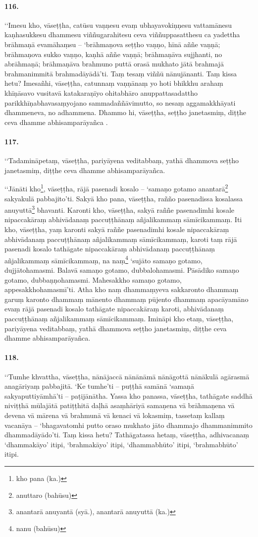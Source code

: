 \paragraph{116.} ‘‘Imesu kho, vāseṭṭha, catūsu vaṇṇesu evaṃ ubhayavokiṇṇesu vattamānesu kaṇhasukkesu dhammesu viññugarahitesu ceva viññuppasatthesu ca yadettha brāhmaṇā evamāhaṃsu – ‘brāhmaṇova seṭṭho vaṇṇo, hīnā aññe vaṇṇā; brāhmaṇova sukko vaṇṇo, kaṇhā aññe vaṇṇā; brāhmaṇāva sujjhanti, no abrāhmaṇā; brāhmaṇāva brahmuno puttā orasā mukhato jātā brahmajā brahmanimmitā brahmadāyādā’ti. Taṃ tesaṃ viññū nānujānanti. Taṃ kissa hetu? Imesañhi, vāseṭṭha, catunnaṃ vaṇṇānaṃ yo hoti bhikkhu arahaṃ khīṇāsavo vusitavā katakaraṇīyo ohitabhāro anuppattasadattho parikkhīṇabhavasaṃyojano sammadaññāvimutto, so nesaṃ aggamakkhāyati dhammeneva, no adhammena. Dhammo hi, vāseṭṭha, seṭṭho janetasmiṃ, diṭṭhe ceva dhamme abhisamparāyañca .

\paragraph{117.} ‘‘Tadamināpetaṃ, vāseṭṭha, pariyāyena veditabbaṃ, yathā dhammova seṭṭho janetasmiṃ, diṭṭhe ceva dhamme abhisamparāyañca.

‘‘Jānāti kho\footnote{kho pana (ka.)}, vāseṭṭha, rājā pasenadi kosalo – ‘samaṇo gotamo anantarā\footnote{anuttaro (bahūsu)} sakyakulā pabbajito’ti. Sakyā kho pana, vāseṭṭha, rañño pasenadissa kosalassa anuyuttā\footnote{anantarā anuyantā (syā.), anantarā anuyuttā (ka.)} bhavanti. Karonti kho, vāseṭṭha, sakyā raññe pasenadimhi kosale nipaccakāraṃ abhivādanaṃ paccuṭṭhānaṃ añjalikammaṃ sāmīcikammaṃ. Iti kho, vāseṭṭha, yaṃ karonti sakyā raññe pasenadimhi kosale nipaccakāraṃ abhivādanaṃ paccuṭṭhānaṃ añjalikammaṃ sāmīcikammaṃ, karoti taṃ rājā pasenadi kosalo tathāgate nipaccakāraṃ abhivādanaṃ paccuṭṭhānaṃ añjalikammaṃ sāmīcikammaṃ, na naṃ\footnote{nanu (bahūsu)} ‘sujāto samaṇo gotamo, dujjātohamasmi. Balavā samaṇo gotamo, dubbalohamasmi. Pāsādiko samaṇo gotamo, dubbaṇṇohamasmi. Mahesakkho samaṇo gotamo, appesakkhohamasmī’ti. Atha kho naṃ dhammaṃyeva sakkaronto dhammaṃ garuṃ karonto dhammaṃ mānento dhammaṃ pūjento dhammaṃ apacāyamāno evaṃ rājā pasenadi kosalo tathāgate nipaccakāraṃ karoti, abhivādanaṃ paccuṭṭhānaṃ añjalikammaṃ sāmīcikammaṃ. Imināpi kho etaṃ, vāseṭṭha, pariyāyena veditabbaṃ, yathā dhammova seṭṭho janetasmiṃ, diṭṭhe ceva dhamme abhisamparāyañca.

\paragraph{118.} ‘‘Tumhe khvattha, vāseṭṭha, nānājaccā nānānāmā nānāgottā nānākulā agārasmā anagāriyaṃ pabbajitā. ‘Ke tumhe’ti – puṭṭhā samānā ‘samaṇā sakyaputtiyāmhā’ti – paṭijānātha. Yassa kho panassa, vāseṭṭha, tathāgate saddhā niviṭṭhā mūlajātā patiṭṭhitā daḷhā asaṃhāriyā samaṇena vā brāhmaṇena vā devena vā mārena vā brahmunā vā kenaci vā lokasmiṃ, tassetaṃ kallaṃ vacanāya – ‘bhagavatomhi putto oraso mukhato jāto dhammajo dhammanimmito dhammadāyādo’ti. Taṃ kissa hetu? Tathāgatassa hetaṃ, vāseṭṭha, adhivacanaṃ ‘dhammakāyo’ itipi, ‘brahmakāyo’ itipi, ‘dhammabhūto’ itipi, ‘brahmabhūto’ itipi.

